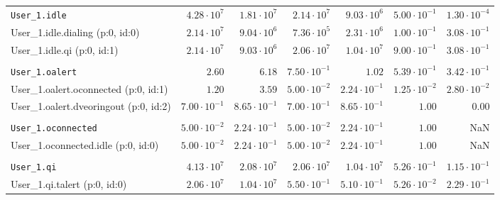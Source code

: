\begin{table}[htbp]
{\begin{tabular}{lrrrrrr}
\\[-8pt]\texttt{User\_1.idle}                        &  $4.28 \cdot 10^{7}$ &  $1.81 \cdot 10^{7}$ &  $2.14 \cdot 10^{7}$ &  $9.03 \cdot 10^{6}$ & $5.00 \cdot 10^{-1}$ & $1.30 \cdot 10^{-4}$ \\
\hspace{3mm}User\_1.idle.dialing (p:0, id:0)         &  $2.14 \cdot 10^{7}$ &  $9.04 \cdot 10^{6}$ &  $7.36 \cdot 10^{5}$ &  $2.31 \cdot 10^{6}$ & $1.00 \cdot 10^{-1}$ & $3.08 \cdot 10^{-1}$ \\
\hspace{3mm}User\_1.idle.qi (p:0, id:1)              &  $2.14 \cdot 10^{7}$ &  $9.03 \cdot 10^{6}$ &  $2.06 \cdot 10^{7}$ &  $1.04 \cdot 10^{7}$ & $9.00 \cdot 10^{-1}$ & $3.08 \cdot 10^{-1}$ \\
\\[-8pt]\texttt{User\_1.oalert}                      &               $2.60$ &               $6.18$ & $7.50 \cdot 10^{-1}$ &               $1.02$ & $5.39 \cdot 10^{-1}$ & $3.42 \cdot 10^{-1}$ \\
\hspace{3mm}User\_1.oalert.oconnected (p:0, id:1)    &               $1.20$ &               $3.59$ & $5.00 \cdot 10^{-2}$ & $2.24 \cdot 10^{-1}$ & $1.25 \cdot 10^{-2}$ & $2.80 \cdot 10^{-2}$ \\
\hspace{3mm}User\_1.oalert.dveoringout (p:0, id:2)   & $7.00 \cdot 10^{-1}$ & $8.65 \cdot 10^{-1}$ & $7.00 \cdot 10^{-1}$ & $8.65 \cdot 10^{-1}$ &               $1.00$ &               $0.00$ \\
\\[-8pt]\texttt{User\_1.oconnected}                  & $5.00 \cdot 10^{-2}$ & $2.24 \cdot 10^{-1}$ & $5.00 \cdot 10^{-2}$ & $2.24 \cdot 10^{-1}$ &               $1.00$ &                  NaN \\
\hspace{3mm}User\_1.oconnected.idle (p:0, id:0)      & $5.00 \cdot 10^{-2}$ & $2.24 \cdot 10^{-1}$ & $5.00 \cdot 10^{-2}$ & $2.24 \cdot 10^{-1}$ &               $1.00$ &                  NaN \\
\\[-8pt]\texttt{User\_1.qi}                          &  $4.13 \cdot 10^{7}$ &  $2.08 \cdot 10^{7}$ &  $2.06 \cdot 10^{7}$ &  $1.04 \cdot 10^{7}$ & $5.26 \cdot 10^{-1}$ & $1.15 \cdot 10^{-1}$ \\
\hspace{3mm}User\_1.qi.talert (p:0, id:0)            &  $2.06 \cdot 10^{7}$ &  $1.04 \cdot 10^{7}$ & $5.50 \cdot 10^{-1}$ & $5.10 \cdot 10^{-1}$ & $5.26 \cdot 10^{-2}$ & $2.29 \cdot 10^{-1}$ \\

\end{tabular}}
\end{table}

